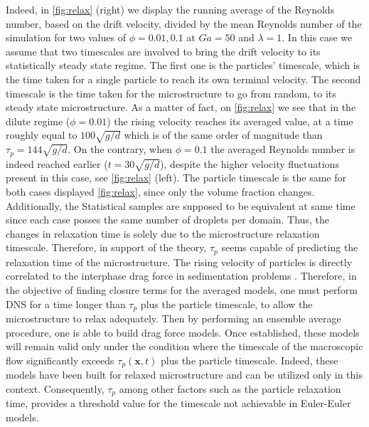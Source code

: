 Indeed, in \ref{fig:relax} (right) we display the running average of the Reynolds number, based on the drift velocity, divided by the mean Reynolds number of the simulation for two values of $\phi = 0.01,0.1$ at $Ga = 50$ and $\lambda =1$. 
In this case we assume that two timescales are involved to bring the drift velocity to its statistically steady state regime. 
The first one is the particles' timescale, which is the time taken for a single particle to reach its own terminal velocity. 
The second timescale is the time taken for the microstructure to go from random, to its steady state microstructure. 
As a matter of fact, on \ref{fig:relax} we see that in the dilute regime ($\phi=0.01$) the rising velocity reaches its averaged value, at a time roughly equal to $100\sqrt{g/d}$ which is of the same order of magnitude than $\tau_p = 144\sqrt{g/d}$. 
On the contrary, when $\phi =0.1$ the averaged Reynolds number is indeed reached earlier ($t = 30\sqrt{g/d}$), despite the higher velocity fluctuations present in this case, see \ref{fig:relax} (left). 
The particle timescale is the same for both cases displayed \ref{fig:relax}, since only the volume fraction changes.
Additionally, the Statistical samples are supposed to be equivalent at same time since each  case posses the same number of droplets per domain. 
Thus, the changes in relaxation time is solely due to the microstructure relaxation timescale. 
Therefore, in support of the theory, $\tau_p$ seems capable of predicting the relaxation time of the microstructure.
The rising velocity of particles is directly correlated to the interphase drag force in sedimentation problems \citep{jackson1997locally}. 
Therefore, in the objective of finding closure terms for the averaged models, one must perform DNS for a time longer than $\tau_p$ plus the particle timescale, to allow the microstructure to relax adequately.
Then by performing an ensemble average procedure, one is able to build drag force models. 
Once established, these models will remain valid only under the condition where the timescale of the macroscopic flow significantly exceeds $\tau_p(\textbf{x},t)$ plus the particle timescale.
Indeed, these models have been built for relaxed microstructure and can be utilized only in this context.
Consequently, $\tau_p$ among other factors such as the particle relaxation time, provides a threshold value for the timescale not achievable in Euler-Euler models. 

